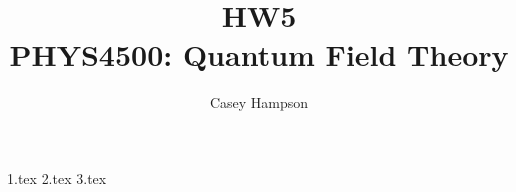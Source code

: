 \documentclass[titlepage]{article}
\title{HW5 \\[5pt] PHYS4500: Quantum Field Theory}
\author{Casey Hampson}
\begin{document}
    \maketitle
    \pagebreak

    {1.tex} %
    {2.tex} 
    {3.tex} 
\end{document}
